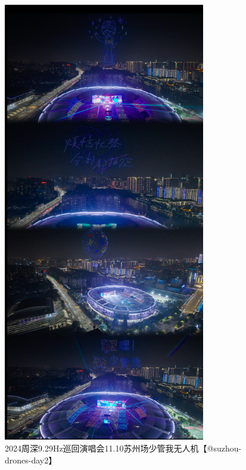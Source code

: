 \documentclass[]{ctexbook}
\begin{document}
\begin{figure}

{\centering \includegraphics[width=250pt]{img/suzhou20241110/002} 

}

\caption{2024周深9.29Hz巡回演唱会11.10苏州场少管我无人机【@suzhou-drones-day2】}\label{fig:unnamed-chunk-136}
\end{figure}
\end{document}
